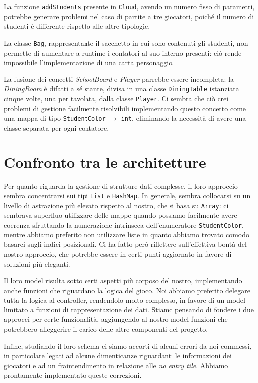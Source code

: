 \documentclass[12pt]{article}
\begin{document}
La funzione \texttt{addStudents} presente in \texttt{Cloud}, avendo un numero fisso di parametri, potrebbe generare problemi nel caso di partite a tre
giocatori, poiché il numero di studenti è differente rispetto alle altre tipologie.

La classe \texttt{Bag}, rappresentante il sacchetto in cui sono contenuti gli studenti, non permette di aumentare a runtime i contatori al suo interno
presenti: ciò rende impossibile l'implementazione di una carta personaggio.

La fusione dei concetti \emph{SchoolBoard} e \emph{Player} parrebbe essere incompleta: la \emph{DiningRoom} è difatti a sé stante, divisa in una classe
\texttt{DiningTable} istanziata cinque volte, una per tavolata, dalla classe \texttt{Player}. Ci sembra che ciò crei problemi di gestione facilmente
risolvibili implementando questo concetto come una mappa di tipo \texttt{StudentColor} \(\to\) \texttt{int}, eliminando la necessità di avere una classe
separata per ogni contatore.

\section*{Confronto tra le architetture}

Per quanto riguarda la gestione di strutture dati complesse, il loro approccio sembra concentrarsi sui tipi \texttt{List} e \texttt{HashMap}. In generale,
sembra collocarsi su un livello di astrazione più elevato rispetto al nostro, che si basa su \texttt{Array}: ci sembrava superfluo utilizzare delle mappe
quando possiamo facilmente avere coerenza sfruttando la numerazione intrinseca dell'enumeratore \texttt{StudentColor}, mentre abbiamo preferito non utilizzare
liste in quanto abbiamo trovato comodo basarci sugli indici posizionali. Ci ha fatto però riflettere sull'effettiva bontà del nostro approccio, che
potrebbe essere in certi punti aggiornato in favore di soluzioni più eleganti.

Il loro model risulta sotto certi aspetti più corposo del nostro, implementando anche funzioni che riguardano la logica del gioco. Noi abbiamo
preferito delegare tutta la logica al controller, rendendolo molto complesso, in favore di un model limitato a funzioni di rappresentazione dei dati.
Stiamo pensando di fondere i due approcci per certe funzionalità, aggiungendo al nostro model funzioni che potrebbero alleggerire il carico delle altre
componenti del progetto.

Infine, studiando il loro schema ci siamo accorti di alcuni errori da noi commessi, in particolare legati ad alcune dimenticanze riguardanti le
informazioni dei giocatori e ad un fraintendimento in relazione alle \emph{no entry tile}. Abbiamo prontamente implementato queste correzioni.
\end{document}
